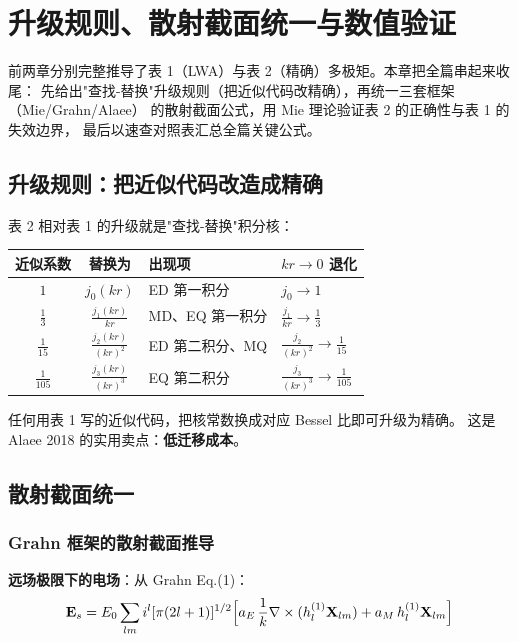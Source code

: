 \section{升级规则、散射截面统一与数值验证}

前两章分别完整推导了表 1（LWA）与表 2（精确）多极矩。本章把全篇串起来收尾：
先给出"查找-替换"升级规则（把近似代码改精确），再统一三套框架（Mie/Grahn/Alaee）
的散射截面公式，用 Mie 理论验证表 2 的正确性与表 1 的失效边界，
最后以速查对照表汇总全篇关键公式。

\subsection{升级规则：把近似代码改造成精确}

表 2 相对表 1 的升级就是"查找-替换"积分核：

\begin{center}
\begin{tabular}{ccll}
\toprule
\textbf{近似系数} & \textbf{替换为} & \textbf{出现项} & \textbf{$kr\to0$ 退化} \\
\midrule
$1$ & $j_0(kr)$ & ED 第一积分 & $j_0\to1$ \\
$\frac13$ & $\frac{j_1(kr)}{kr}$ & MD、EQ 第一积分 & $\frac{j_1}{kr}\to\frac13$ \\
$\frac1{15}$ & $\frac{j_2(kr)}{(kr)^2}$ & ED 第二积分、MQ & $\frac{j_2}{(kr)^2}\to\frac1{15}$ \\
$\frac1{105}$ & $\frac{j_3(kr)}{(kr)^3}$ & EQ 第二积分 & $\frac{j_3}{(kr)^3}\to\frac1{105}$ \\
\bottomrule
\end{tabular}
\end{center}

\begin{noteworthy}
任何用表 1 写的近似代码，把核常数换成对应 Bessel 比即可升级为精确。
这是 Alaee 2018 的实用卖点：\textbf{低迁移成本}。
\end{noteworthy}

\subsection{散射截面统一}

\subsubsection{Grahn 框架的散射截面推导}

\textbf{远场极限下的电场}：从 Grahn Eq.(1)：
\begin{equation}
  \mathbf{E}_s = E_0\sum_{lm} i^l[\pi(2l+1)]^{1/2}\Bigl[
    a_E\,\frac{1}{k}\nabla\times(h_l^{(1)}\mathbf{X}_{lm})
    + a_M\,h_l^{(1)}\mathbf{X}_{lm}\Bigr]
\end{equation}

